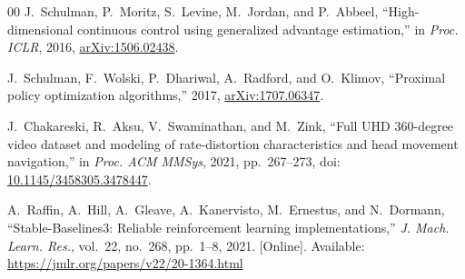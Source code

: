 \documentclass[conference]{IEEEtran}
\begin{document}
\begin{thebibliography}{00}
J.~Schulman, P.~Moritz, S.~Levine, M.~Jordan, and P.~Abbeel, ``High-dimensional continuous control using generalized advantage estimation,'' in \emph{Proc. ICLR}, 2016, \href{https://arxiv.org/abs/1506.02438}{arXiv:1506.02438}.

J.~Schulman, F.~Wolski, P.~Dhariwal, A.~Radford, and O.~Klimov, ``Proximal policy optimization algorithms,'' 2017, \href{https://arxiv.org/abs/1707.06347}{arXiv:1707.06347}.

J.~Chakareski, R.~Aksu, V.~Swaminathan, and M.~Zink, ``Full UHD 360-degree video dataset and modeling of rate-distortion characteristics and head movement navigation,'' in \emph{Proc. ACM MMSys}, 2021, pp.~267--273, doi: \href{https://doi.org/10.1145/3458305.3478447}{10.1145/3458305.3478447}.

A.~Raffin, A.~Hill, A.~Gleave, A.~Kanervisto, M.~Ernestus, and N.~Dormann, ``Stable-Baselines3: Reliable reinforcement learning implementations,'' \emph{J. Mach. Learn. Res.}, vol.~22, no.~268, pp.~1--8, 2021. [Online]. Available: \url{https://jmlr.org/papers/v22/20-1364.html}

\end{thebibliography}
\end{document}
